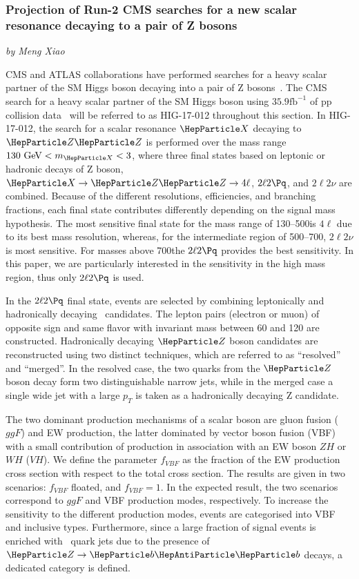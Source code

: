 \subsubsection{Projection of Run-2 CMS searches for a new scalar resonance decaying to a pair of Z bosons}
\begin{center}
 {\it{ by Meng Xiao}}
\end{center}

CMS and ATLAS collaborations have performed searches for a heavy scalar partner of the SM Higgs boson decaying into a pair of Z bosons~\cite{Aaboud:2018bun,Sirunyan:2018qlb}. The CMS search for a heavy scalar partner of the SM Higgs boson using $35.9 \mathrm{fb}^{-1}$ of pp collision data~\cite{Sirunyan:2018qlb} will be referred to as HIG-17-012 throughout this section. In HIG-17-012, the search for a scalar resonance $\PX$ decaying to $\PZ \PZ$ is performed over the mass range $130\UGeV < m_{\PX} < 3$\UTeV, where three final states based on leptonic or hadronic decays of Z boson, $\PX\to \PZ\PZ\to 4\ell$, $2\ell2\Pq$, and $2\ell2\nu$ are combined. Because of the different resolutions, efficiencies, and branching fractions, each final state contributes differently depending on the signal mass hypothesis. The most sensitive final state for the mass range of 130--500\UGeV is $4\ell$ due to its best mass resolution, whereas, for the intermediate region of 500--700\UGeV, $2\ell2\nu$ is most sensitive. For masses above 700\UGeV the $2\ell2\Pq$ provides the best sensitivity. In this paper, we are particularly interested in the sensitivity in the high mass region, thus only $2\ell2\Pq$ is used. 

In the $2\ell2\Pq$ final state, events are selected by combining leptonically
and hadronically decaying \PZ\ candidates. The lepton pairs (electron or muon) of opposite sign and same flavor 
with invariant mass between 60 and 120 \UGeV are constructed.
Hadronically decaying $\PZ$ boson candidates are reconstructed using two distinct
techniques, which are referred to as ``resolved'' and ``merged''.
In the resolved case, the two quarks from the $\PZ$ boson decay form two distinguishable narrow jets, while in the merged case a single wide jet with a large $p_T$ is taken as a hadronically decaying Z candidate.

The two dominant production mechanisms of a scalar boson are gluon fusion ($ggF$) and EW production, the latter dominated by vector boson fusion (VBF) with a small contribution of
production in association with an EW boson $ZH$ or $WH$ ($VH$). We define the parameter $f_{VBF}$ as the fraction of the EW production cross section with respect to the total cross section. The results are given in two scenarios: $f_{VBF}$ floated, and $f_{VBF}=1$. In the expected result, the two scenarios correspond to $ggF$ and VBF production modes, respectively. To increase the sensitivity to the different production modes, events are categorised into VBF and inclusive types. Furthermore, since a large fraction of signal events is enriched with \PQb\ quark jets due to the presence of $\PZ\to\PQb\PAQb$ decays, a dedicated category is defined.

